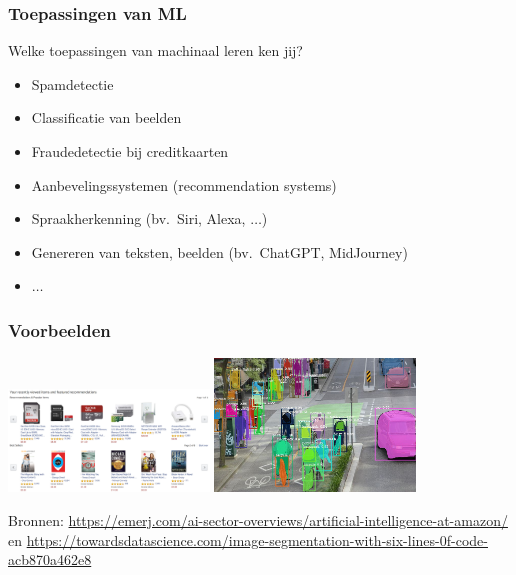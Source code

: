 \documentclass[aspectratio=169]{beamer}
\begin{document}
\begin{frame}
\frametitle{Toepassingen van ML}
Welke toepassingen van machinaal leren ken jij?
\pause
\begin{itemize}
	\item Spamdetectie
	\item Classificatie van beelden
	\item Fraudedetectie bij creditkaarten
	\item Aanbevelingssystemen (recommendation systems)
	\item Spraakherkenning (bv.\ Siri, Alexa, $\ldots$)
	\item Genereren van teksten, beelden (bv.\ ChatGPT, MidJourney)
	\item $\ldots$
\end{itemize}
\end{frame}

\begin{frame}
\frametitle{Voorbeelden}
\begin{center}
\includegraphics[width=0.4\textwidth]{graphics/amazon-recommendation}
\quad
\includegraphics[width=0.4\textwidth]{graphics/beeld-segmentatie}
\end{center}
\tiny{Bronnen: \url{https://emerj.com/ai-sector-overviews/artificial-intelligence-at-amazon/} en  \url{https://towardsdatascience.com/image-segmentation-with-six-lines-0f-code-acb870a462e8}}
\end{frame}
\end{document}
